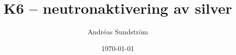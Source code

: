 \documentclass[11pt,a4paper, english, swedish
]{article}
\begin{document}

\title{K6 -- neutronaktivering av silver}
\author{Andréas Sundström}
\date{\today}

\maketitle

\begin{abstract}


\end{abstract}


\section{}


\subsection{}


% 
\end{document}
